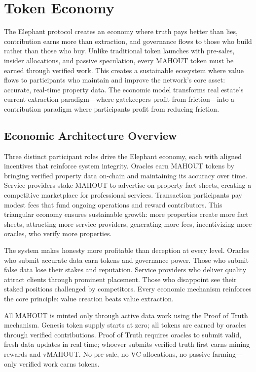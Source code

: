 \chapter{Token Economy}

The Elephant protocol creates an economy where truth pays better than lies, contribution earns more than extraction, and governance flows to those who build rather than those who buy. Unlike traditional token launches with pre-sales, insider allocations, and passive speculation, every MAHOUT token must be earned through verified work. This creates a sustainable ecosystem where value flows to participants who maintain and improve the network's core asset: accurate, real-time property data. The economic model transforms real estate's current extraction paradigm—where gatekeepers profit from friction—into a contribution paradigm where participants profit from reducing friction.

\section{Economic Architecture Overview}

Three distinct participant roles drive the Elephant economy, each with aligned incentives that reinforce system integrity. Oracles earn MAHOUT tokens by bringing verified property data on-chain and maintaining its accuracy over time. Service providers stake MAHOUT to advertise on property fact sheets, creating a competitive marketplace for professional services. Transaction participants pay modest fees that fund ongoing operations and reward contributors. This triangular economy ensures sustainable growth: more properties create more fact sheets, attracting more service providers, generating more fees, incentivizing more oracles, who verify more properties.

The system makes honesty more profitable than deception at every level. Oracles who submit accurate data earn tokens and governance power. Those who submit false data lose their stakes and reputation. Service providers who deliver quality attract clients through prominent placement. Those who disappoint see their staked positions challenged by competitors. Every economic mechanism reinforces the core principle: value creation beats value extraction.

All MAHOUT is minted only through active data work using the Proof of Truth mechanism. Genesis token supply starts at zero; all tokens are earned by oracles through verified contributions. Proof of Truth requires oracles to submit valid, fresh data updates in real time; whoever submits verified truth first earns mining rewards and vMAHOUT. No pre-sale, no VC allocations, no passive farming—only verified work earns tokens.

